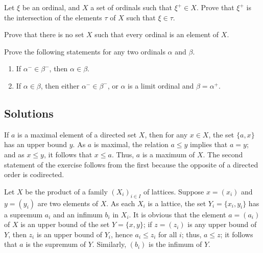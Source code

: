 \documentclass{article}
\begin{document}
\begin{exercise}
  \label{exe:ddc4bdfk}
  Let \(\xi\) be an ordinal, and \(X\) a set of ordinals such that
  \(\xi^+ \in X\).  Prove that \(\xi^+\) is the intersection of the
  elements \(\tau\) of \(X\) such that \(\xi \in \tau\).
\end{exercise}

\begin{exercise}
  \label{exe:9pk4eh7k}
  Prove that there is no set \(X\) such that every ordinal is an
  element of \(X\).
\end{exercise}

\begin{exercise}
  \label{exe:7tvca54w}
  Prove the following statements for any two ordinals \(\alpha\) and
  \(\beta\).
  \begin{enumerate}
  \item If \(\alpha^- \in \beta^-\), then \(\alpha \in \beta\).
  \item If \(\alpha \in \beta\), then either \(\alpha^- \in \beta^-\),
    or \(\alpha\) is a limit ordinal and \(\beta = \alpha^+\).
  \end{enumerate}
\end{exercise}

\subsection{Solutions}
\label{sec:fzhm4l61}

\begin{solution}[\ref{exe:swjbrepg}]
  \label{sol:pcqde5hb}
  If \(a\) is a maximal element of a directed set \(X\), then for any
  \(x \in X\), the set \(\{ a, x \}\) has an upper bound \(y\).  As
  \(a\) is maximal, the relation \(a \leq y\) implies that \(a = y\);
  and as \(x \leq y\), it follows that \(x \leq a\).  Thus, \(a\) is a
  maximum of \(X\).  The second statement of the exercise follows from
  the first because the opposite of a directed order is codirected.
\end{solution}

\begin{solution}[\ref{exe:yowl3axc}]
  \label{sol:rfwhck5v}
  Let \(X\) be the product of a family \((X_i)_{i \in I}\) of
  lattices.  Suppose \(x = (x_i)\) and \(y = (y_i)\) are two elements
  of \(X\).  As each \(X_i\) is a lattice, the set
  \(Y_i = \{ x_i, y_i \}\) has a supremum \(a_i\) and an infimum
  \(b_i\) in \(X_i\).  It is obvious that the element \(a = (a_i)\) of
  \(X\) is an upper bound of the set \(Y = \{ x, y \}\); if
  \(z = (z_i)\) is any upper bound of \(Y\), then \(z_i\) is an upper
  bound of \(Y_i\), hence \(a_i \leq z_i\) for all \(i\); thus,
  \(a \leq z\); it follows that \(a\) is the supremum of \(Y\).
  Similarly, \((b_i)\) is the infimum of \(Y\).
\end{solution}
\end{document}
